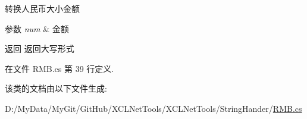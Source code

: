转换人民币大小金额 


\begin{DoxyParams}{参数}
{\em num} & 金额\\
\hline
\end{DoxyParams}
\begin{DoxyReturn}{返回}
返回大写形式
\end{DoxyReturn}


在文件 R\-M\-B.\-cs 第 39 行定义.



该类的文档由以下文件生成\-:\begin{DoxyCompactItemize}
\item 
D\-:/\-My\-Data/\-My\-Git/\-Git\-Hub/\-X\-C\-L\-Net\-Tools/\-X\-C\-L\-Net\-Tools/\-String\-Hander/\hyperlink{_r_m_b_8cs}{R\-M\-B.\-cs}\end{DoxyCompactItemize}
